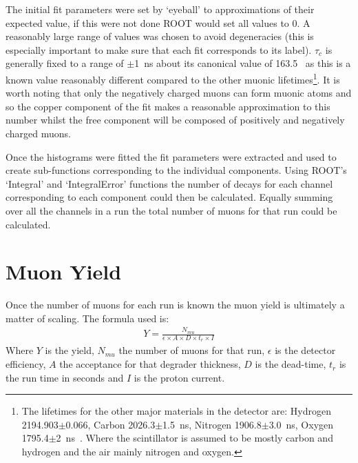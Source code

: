 \documentclass[]{article}
\begin{document}
The initial fit parameters were set by `eyeball' to approximations of their expected value, if this were not done ROOT would set all values to 0. A reasonably large range of values was chosen to avoid degeneracies (this is especially important to make sure that each fit corresponds to its label). $\tau_{c}$ is generally fixed to a range of $\pm$1~ns about its canonical value of 163.5~\cite{PhysRevC.35.2212} as this is a known value reasonably different compared to the other muonic lifetimes\footnote{The lifetimes for the other major materials in the detector are: Hydrogen 2194.903$\pm$0.066, Carbon 2026.3$\pm$1.5~ns, Nitrogen 1906.8$\pm$3.0~ns, Oxygen 1795.4$\pm$2~ns~\cite{PhysRevC.35.2212}. Where the scintillator is assumed to be mostly carbon and hydrogen and the air mainly nitrogen and oxygen.}. It is worth noting that only the negatively charged muons can form muonic atoms and so the copper component of the fit makes a reasonable approximation to this number whilst the free component will be composed of positively and negatively charged muons.

Once the histograms were fitted the fit parameters were extracted and used to create sub-functions corresponding to the individual components. Using ROOT's `Integral' and `IntegralError' functions the number of decays for each channel corresponding to each component could then be calculated. Equally summing over all the channels in a run the total number of muons for that run could be calculated.
\section{Muon Yield} %
\label{sec:muon_yield}
Once the number of muons for each run is known the muon yield is ultimately a matter of scaling. The formula used is:
\begin{align}
    Y = \frac{N_{mu}}{\epsilon \times A \times D \times t_{r} \times I}
\end{align}
Where $Y$ is the yield, $N_{mu}$ the number of muons for that run, $\epsilon$ is the detector efficiency, $A$ the acceptance for that degrader thickness, $D$ is the dead-time, $t_{r}$ is the run time in seconds and $I$ is the proton current.
\end{document}
